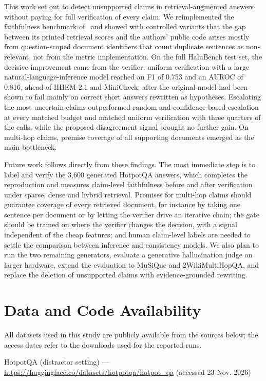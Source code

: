 \documentclass[conference]{IEEEtran}
\begin{document}
This work set out to detect unsupported claims in retrieval-augmented answers without paying for full verification of every claim. We reimplemented the faithfulness benchmark of~\cite{mala_ml} and showed with controlled variants that the gap between its printed retrieval scores and the authors' public code arises mostly from question-scoped document identifiers that count duplicate sentences as non-relevant, not from the metric implementation. On the full HaluBench test set, the decisive improvement came from the verifier: uniform verification with a large natural-language-inference model reached an F1 of 0.753 and an AUROC of 0.816, ahead of HHEM-2.1 and MiniCheck, after the original model had been shown to fail mainly on correct short answers rewritten as hypotheses. Escalating the most uncertain claims outperformed random and confidence-based escalation at every matched budget and matched uniform verification with three quarters of the calls, while the proposed disagreement signal brought no further gain. On multi-hop claims, premise coverage of all supporting documents emerged as the main bottleneck.

Future work follows directly from these findings. The most immediate step is to label and verify the 3,600 generated HotpotQA answers, which completes the reproduction and measures claim-level faithfulness before and after verification under sparse, dense and hybrid retrieval. Premises for multi-hop claims should guarantee coverage of every retrieved document, for instance by taking one sentence per document or by letting the verifier drive an iterative chain; the gate should be trained on where the verifier changes the decision, with a signal independent of the cheap features; and human claim-level labels are needed to settle the comparison between inference and consistency models. We also plan to run the two remaining generators, evaluate a generative hallucination judge on larger hardware, extend the evaluation to MuSiQue and 2WikiMultiHopQA, and replace the deletion of unsupported claims with evidence-grounded rewriting.

\section*{Data and Code Availability}

All datasets used in this study are publicly available from the sources below; the access dates refer to the downloads used for the reported runs.

\textbullet{} HotpotQA (distractor setting) --- \url{https://huggingface.co/datasets/hotpotqa/hotpot_qa} (accessed 23 Nov. 2026)
\end{document}
